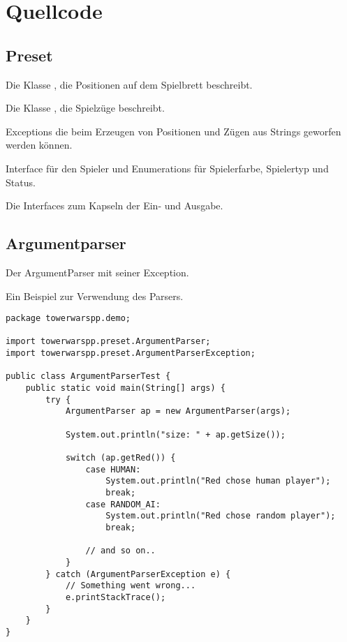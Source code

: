 \section*{Quellcode}
\subsection*{Preset}
Die Klasse , die Positionen auf dem Spielbrett beschreibt.


Die Klasse , die Spielzüge beschreibt.


Exceptions die beim Erzeugen von Positionen und Zügen aus Strings geworfen werden können.

 \newpage

Interface für den Spieler und Enumerations für Spielerfarbe, Spielertyp und Status.





Die Interfaces zum Kapseln der Ein- und Ausgabe.




\newpage
\subsection*{Argumentparser}
Der ArgumentParser mit seiner Exception.



\newpage
Ein Beispiel zur Verwendung des Parsers.
\begin{lstlisting}
package towerwarspp.demo;

import towerwarspp.preset.ArgumentParser;
import towerwarspp.preset.ArgumentParserException;

public class ArgumentParserTest {
    public static void main(String[] args) {
        try {
            ArgumentParser ap = new ArgumentParser(args);

            System.out.println("size: " + ap.getSize());

            switch (ap.getRed()) {
                case HUMAN:
                    System.out.println("Red chose human player");
                    break;
                case RANDOM_AI:
                    System.out.println("Red chose random player");
                    break;

                // and so on..
            }
        } catch (ArgumentParserException e) {
            // Something went wrong...
            e.printStackTrace();
        }
    }
}

\end{lstlisting}

